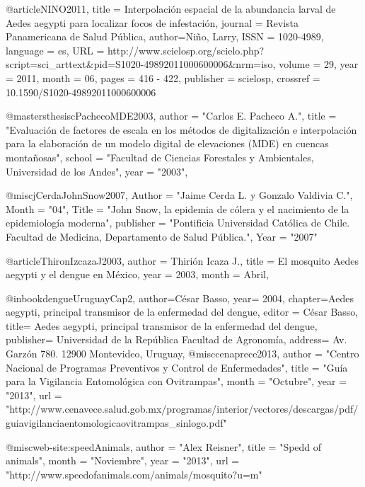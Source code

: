 @article{NINO2011,
   title = {Interpolación espacial de la abundancia larval de Aedes aegypti para localizar focos de infestación},
   journal = {Revista Panamericana de Salud Pública},
   author={Niño, Larry},
   ISSN = {1020-4989},
   language = {es},
   URL = {http://www.scielosp.org/scielo.php?script=sci_arttext&pid=S1020-49892011000600006&nrm=iso},
   volume = {29},
   year = {2011},
   month = {06},
   pages = {416 - 422},
   publisher = {scielosp},
   crossref = {10.1590/S1020-49892011000600006}
}

@mastersthesis{cPachecoMDE2003,
    author    = "Carlos E. Pacheco A.",
    title     = "Evaluación de factores de escala en los métodos de digitalización e interpolación para la elaboración de un modelo digital de elevaciones (MDE) en cuencas montañosas",
    school    = "Facultad de Ciencias Forestales y Ambientales, Universidad de los Andes",
    year      = "2003",
}

@misc{jCerdaJohnSnow2007,
    Author = "Jaime Cerda L. y Gonzalo Valdivia C.",
    Month = "04",
    Title = "John Snow, la epidemia de cólera y el nacimiento de la epidemiología moderna",
    publisher = "Pontificia Universidad Católica de Chile. Facultad de Medicina, Departamento de Salud Pública.",
    Year = "2007"
}


@article{ThironIzcazaJ2003,
    author = {Thirión Icaza J.},
    title = {El mosquito Aedes aegypti y el dengue en México},
    year = {2003},
    month = {Abril},
}

@inbook{dengueUruguayCap2,
  author={César Basso},
  year= 2004,
  chapter={Aedes aegypti, principal transmisor de la enfermedad del dengue},
  editor = {César Basso},
  title= {Aedes aegypti, principal transmisor de la enfermedad del dengue},
  publisher= {Universidad de la República Facultad de Agronomía},
  address= {Av. Garzón 780. 12900 Montevideo, Uruguay},
}
@misc{cenaprece2013,
      author = "Centro Nacional de Programas Preventivos y Control de Enfermedades",
      title = "Guía para la Vigilancia Entomológica con Ovitrampas",
      month = "Octubre",
      year = "2013",
      url = "http://www.cenavece.salud.gob.mx/programas/interior/vectores/descargas/pdf/guiavigilanciaentomologicaovitrampas_sinlogo.pdf"
}

@misc{web-site:speedAnimals,
      author = "Alex Reisner",
      title = "Spedd of animals",
      month = "Noviembre",
      year = "2013",
      url = "http://www.speedofanimals.com/animals/mosquito?u=m"
}

